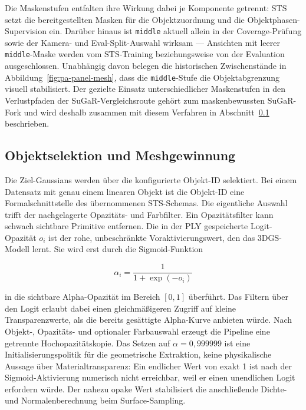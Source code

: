 Die Maskenstufen entfalten ihre Wirkung dabei je Komponente getrennt: STS
setzt die bereitgestellten Masken für die Objektzuordnung und die
Objektphasen-Supervision ein. Darüber hinaus ist \texttt{middle} aktuell
allein in der Coverage-Prüfung sowie der Kamera- und Eval-Split-Auswahl
wirksam — Ansichten mit leerer \texttt{middle}-Maske werden vom STS-Training
beziehungsweise von der Evaluation ausgeschlossen. Unabhängig davon belegen
die historischen Zwischenstände in Abbildung~\ref{fig:pa-panel-mesh}, dass
die \texttt{middle}-Stufe die Objektabgrenzung visuell stabilisiert. Der
gezielte Einsatz unterschiedlicher Maskenstufen in den Verlustpfaden der
SuGaR-Vergleichsroute gehört zum maskenbewussten SuGaR-Fork und wird deshalb
zusammen mit diesem Verfahren in Abschnitt~\ref{subsec:meshgewinnung}
beschrieben.

\subsection{Objektselektion und Meshgewinnung}
\label{subsec:meshgewinnung}

Die Ziel-Gaussians werden über die konfigurierte Objekt-ID selektiert. Bei einem
Datensatz mit genau einem linearen Objekt ist die Objekt-ID eine
Formalschnittstelle des übernommenen STS-Schemas. Die eigentliche Auswahl
trifft der nachgelagerte Opazitäts- und Farbfilter. Ein Opazitätsfilter kann
schwach sichtbare Primitive entfernen. Die in der PLY gespeicherte
Logit-Opazität $o_i$ ist der rohe, unbeschränkte Voraktivierungswert, den das
3DGS-Modell lernt. Sie wird erst durch die Sigmoid-Funktion

\begin{equation}
	\alpha_i = \frac{1}{1+\exp(-o_i)}
	\label{eq:opacity}
\end{equation}

in die sichtbare Alpha-Opazität im Bereich $[0,1]$ überführt. Das Filtern über
den Logit erlaubt dabei einen gleichmäßigeren Zugriff auf kleine
Transparenzwerte, als die bereits gesättigte Alpha-Kurve anbieten würde. Nach
Objekt-, Opazitäts- und optionaler Farbauswahl erzeugt die Pipeline eine
getrennte Hochopazitätskopie. Das Setzen auf $\alpha=0{,}999999$ ist eine
Initialisierungspolitik für die geometrische Extraktion, keine physikalische
Aussage über Materialtransparenz: Ein endlicher Wert von exakt 1 ist nach der
Sigmoid-Aktivierung numerisch nicht erreichbar, weil er einen unendlichen
Logit erfordern würde. Der nahezu opake Wert stabilisiert die anschließende
Dichte- und Normalenberechnung beim Surface-Sampling.

